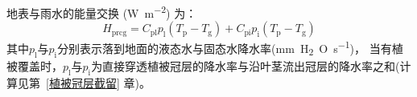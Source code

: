 地表与雨水的能量交换 (\unit{W.m^{-2}}) 为：
\begin{equation}
  H_{\mathrm{p r c g}}=C_{\mathrm{p l}} p_{\mathrm{l}}\left(T_{\mathrm{p}}-T_{\mathrm{g}}\right)+C_{\mathrm{p i}} p_{\mathrm{i}}\left(T_{\mathrm{p}}-T_{\mathrm{g}}\right)
\end{equation}
其中$p_{\mathrm {l}}$与$p_{\mathrm {i}}$分别表示落到地面的液态水与固态水降水率(\unit{mm.H_2O.s^{-1}})，
当有植被覆盖时，$p_{\mathrm {l}}$与$p_{\mathrm {i}}$为直接穿透植被冠层的降水率与沿叶茎流出冠层的降水率之和(计算见第~\ref{植被冠层截留} 章)。
